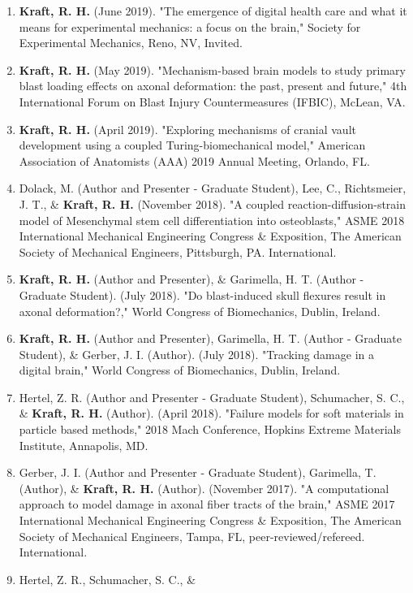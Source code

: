 \documentclass[a4paper,10pt]{article}
\begin{document}
\begin{enumerate}
  \item \textbf{\textbf{Kraft,} R. H.} (June 2019). "The emergence of digital health care and what it means for experimental mechanics: a focus on the brain," Society for Experimental Mechanics, Reno, NV, Invited.
  \item \textbf{\textbf{Kraft,} R. H.} (May 2019). "Mechanism-based brain models to study primary blast loading effects on axonal deformation: the past, present and future," 4th International Forum on Blast Injury Countermeasures (IFBIC), McLean, VA.
  \item \textbf{\textbf{Kraft,} R. H.} (April 2019). "Exploring mechanisms of cranial vault development using a coupled Turing-biomechanical model," American Association of Anatomists (AAA) 2019 Annual Meeting, Orlando, FL.
  \item Dolack, M. (Author and Presenter - Graduate Student), Lee, C., Richtsmeier, J. T., \&
 \textbf{\textbf{Kraft,} R. H.} (November 2018). "A coupled reaction-diffusion-strain model of Mesenchymal stem cell differentiation into osteoblasts," ASME 2018 International Mechanical Engineering Congress \&
 Exposition, The American Society of Mechanical Engineers, Pittsburgh, PA. International.
  \item \textbf{\textbf{Kraft,} R. H.} (Author and Presenter), \&
 Garimella, H. T. (Author - Graduate Student). (July 2018). "Do blast-induced skull flexures result in axonal deformation?," World Congress of Biomechanics, Dublin, Ireland.
  \item \textbf{\textbf{Kraft,} R. H.} (Author and Presenter), Garimella, H. T. (Author - Graduate Student), \&
 Gerber, J. I. (Author). (July 2018). "Tracking damage in a digital brain," World Congress of Biomechanics, Dublin, Ireland.
  \item Hertel, Z. R. (Author and Presenter - Graduate Student), Schumacher, S. C., \&
 \textbf{\textbf{Kraft,} R. H.} (Author). (April 2018). "Failure models for soft materials in particle based methods," 2018 Mach Conference, Hopkins Extreme Materials Institute, Annapolis, MD.
  \item Gerber, J. I. (Author and Presenter - Graduate Student), Garimella, T. (Author), \&
 \textbf{\textbf{Kraft,} R. H.} (Author). (November 2017). "A computational approach to model damage in axonal fiber tracts of the brain," ASME 2017 International Mechanical Engineering Congress \&
 Exposition, The American Society of Mechanical Engineers, Tampa, FL, peer-reviewed/refereed. International.
  \item Hertel, Z. R., Schumacher, S. C., \&

\end{enumerate}
\end{document}

